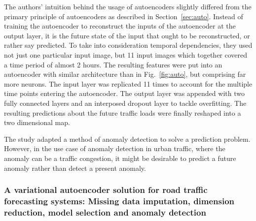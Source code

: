 \documentclass[conference]{IEEEtran}
\begin{document}
The authors' intuition behind the usage of autoencoders slightly differed from the primary principle of autoencoders as described in Section~\ref{sec:auto}. Instead of training the autoencoder to reconstruct the inputs of the autoencoder at the output layer, it is the future state of the input that ought to be reconstructed, or rather say predicted. To take into consideration temporal dependencies, they used not just one particular input image, but 11 input images which together covered a time period of almost 2 hours. The resulting features were put into an autoencoder with similar architecture than in Fig.~\ref{fig:auto}, but comprising far more neurons. The input layer was replicated 11 times to account for the multiple time points entering the autoencoder. The output layer was appended with two fully connected layers and an interposed dropout layer to tackle overfitting. The resulting predictions about the future traffic loads were finally reshaped into a two dimensional map.

The study adapted a method of anomaly detection to solve a prediction problem. However, in the use case of anomaly detection in urban traffic, where the anomaly can be a traffic congestion, it might be desirable to predict a future anomaly rather than detect a present anomaly. %






\subsubsection{A variational autoencoder solution for road traffic forecasting systems: Missing data imputation, dimension reduction, model selection and anomaly detection \cite{boquet2020variational}}
\label{sec:ex4}
\end{document}
